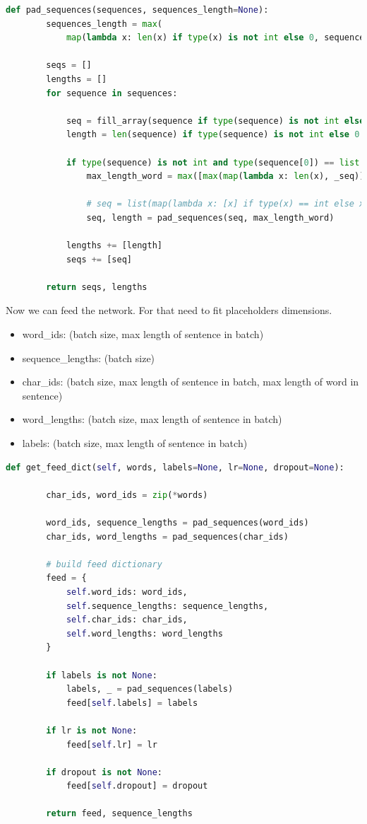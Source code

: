 \begin{lstlisting}[language=Python,caption={Make embeddings}]
    def pad_sequences(sequences, sequences_length=None):
        sequences_length = max(
            map(lambda x: len(x) if type(x) is not int else 0, sequences)) if sequences_length is None else sequences_length
    
        seqs = []
        lengths = []
        for sequence in sequences:
    
            seq = fill_array(sequence if type(sequence) is not int else [sequence], sequences_length)
            length = len(sequence) if type(sequence) is not int else 0
    
            if type(sequence) is not int and type(sequence[0]) == list:
                max_length_word = max([max(map(lambda x: len(x), _seq)) for _seq in sequences])
    
                # seq = list(map(lambda x: [x] if type(x) == int else x, seq))
                seq, length = pad_sequences(seq, max_length_word)
    
            lengths += [length]
            seqs += [seq]
    
        return seqs, lengths
\end{lstlisting}

Now we can feed the network. For that need to fit placeholders dimensions.

\begin{itemize}
    \item word\_ids: (batch size, max length of sentence in batch)
    \item sequence\_lengths: (batch size)
    \item char\_ids: (batch size, max length of sentence in batch, max length of word in sentence)
    \item word\_lengths: (batch size, max length of sentence in batch)
    \item labels: (batch size, max length of sentence in batch)
\end{itemize}

\begin{lstlisting}[language=Python,caption={Feed network}]
    def get_feed_dict(self, words, labels=None, lr=None, dropout=None):

        char_ids, word_ids = zip(*words)

        word_ids, sequence_lengths = pad_sequences(word_ids)
        char_ids, word_lengths = pad_sequences(char_ids)

        # build feed dictionary
        feed = {
            self.word_ids: word_ids,
            self.sequence_lengths: sequence_lengths,
            self.char_ids: char_ids,
            self.word_lengths: word_lengths
        }

        if labels is not None:
            labels, _ = pad_sequences(labels)
            feed[self.labels] = labels

        if lr is not None:
            feed[self.lr] = lr

        if dropout is not None:
            feed[self.dropout] = dropout

        return feed, sequence_lengths
\end{lstlisting}

